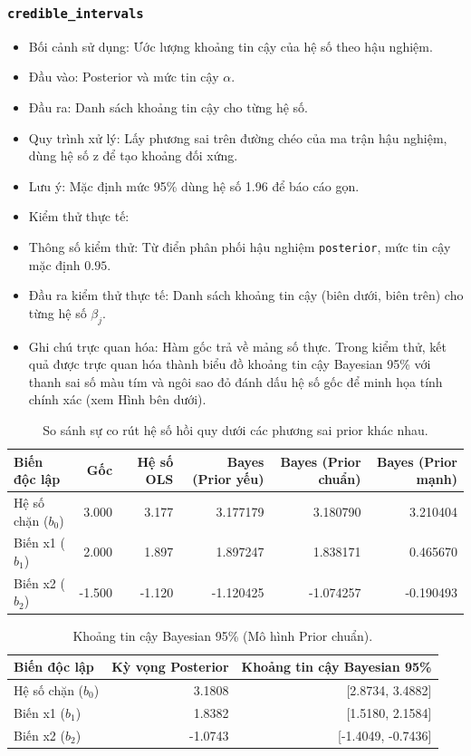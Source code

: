 \documentclass[a4paper]{article}
\newcommand{\code}[1]{\colorbox{light-gray}{\texttt{#1}}}
\begin{document}
\subsubsection{\code{credible\_intervals}}
\begin{itemize}[leftmargin=*]
    \item Bối cảnh sử dụng: Ước lượng khoảng tin cậy của hệ số theo hậu nghiệm.
    \item Đầu vào: Posterior và mức tin cậy $\alpha$.
    \item Đầu ra: Danh sách khoảng tin cậy cho từng hệ số.
    \item Quy trình xử lý: Lấy phương sai trên đường chéo của ma trận hậu nghiệm, dùng hệ số z để tạo khoảng đối xứng.
    \item Lưu ý: Mặc định mức 95\% dùng hệ số 1.96 để báo cáo gọn.
    \item Kiểm thử thực tế:
    \item Thông số kiểm thử: Từ điển phân phối hậu nghiệm \texttt{posterior}, mức tin cậy mặc định $0.95$.
    \item Đầu ra kiểm thử thực tế: Danh sách khoảng tin cậy (biên dưới, biên trên) cho từng hệ số $\beta_j$.
    \item Ghi chú trực quan hóa: Hàm gốc trả về mảng số thực. Trong kiểm thử, kết quả được trực quan hóa thành biểu đồ khoảng tin cậy Bayesian 95\% với thanh sai số màu tím và ngôi sao đỏ đánh dấu hệ số gốc để minh họa tính chính xác (xem Hình bên dưới).
\end{itemize}

\begin{table}[H]
    \centering
    \small
    \begin{tabular}{lrrrrr}
    \toprule
    \textbf{Biến độc lập} & \textbf{Gốc} & \textbf{Hệ số OLS} & \textbf{Bayes} (Prior yếu) & \textbf{Bayes} (Prior chuẩn) & \textbf{Bayes} (Prior mạnh) \\
    \midrule
    Hệ số chặn ($b_0$) & 3.000 & 3.177 & 3.177179 & 3.180790 & 3.210404 \\
    Biến x1 ($b_1$) & 2.000 & 1.897 & 1.897247 & 1.838171 & 0.465670 \\
    Biến x2 ($b_2$) & -1.500 & -1.120 & -1.120425 & -1.074257 & -0.190493 \\
    \bottomrule
    \end{tabular}
    \caption{So sánh sự co rút hệ số hồi quy dưới các phương sai prior khác nhau.}
\end{table}

\begin{table}[H]
    \centering
    \small
    \begin{tabular}{lrr}
    \toprule
    \textbf{Biến độc lập} & \textbf{Kỳ vọng Posterior} & \textbf{Khoảng tin cậy Bayesian 95\%} \\
    \midrule
    Hệ số chặn ($b_0$) & 3.1808 & [2.8734, 3.4882] \\
    Biến x1 ($b_1$) & 1.8382 & [1.5180, 2.1584] \\
    Biến x2 ($b_2$) & -1.0743 & [-1.4049, -0.7436] \\
    \bottomrule
    \end{tabular}
    \caption{Khoảng tin cậy Bayesian 95\% (Mô hình Prior chuẩn).}
\end{table}
\end{document}
